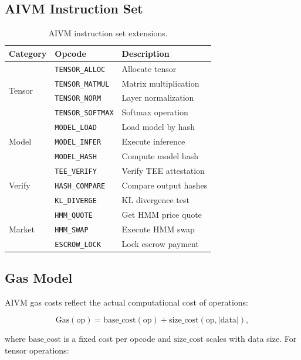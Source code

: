 \documentclass[11pt,twocolumn]{article}
\begin{document}
\subsection{AIVM Instruction Set}

\begin{table}[H]
\centering
\small
\begin{tabular}{lll}
\toprule
\textbf{Category} & \textbf{Opcode} & \textbf{Description} \\
\midrule
\multirow{4}{*}{Tensor} & \texttt{TENSOR\_ALLOC} & Allocate tensor \\
& \texttt{TENSOR\_MATMUL} & Matrix multiplication \\
& \texttt{TENSOR\_NORM} & Layer normalization \\
& \texttt{TENSOR\_SOFTMAX} & Softmax operation \\
\midrule
\multirow{3}{*}{Model} & \texttt{MODEL\_LOAD} & Load model by hash \\
& \texttt{MODEL\_INFER} & Execute inference \\
& \texttt{MODEL\_HASH} & Compute model hash \\
\midrule
\multirow{3}{*}{Verify} & \texttt{TEE\_VERIFY} & Verify TEE attestation \\
& \texttt{HASH\_COMPARE} & Compare output hashes \\
& \texttt{KL\_DIVERGE} & KL divergence test \\
\midrule
\multirow{3}{*}{Market} & \texttt{HMM\_QUOTE} & Get HMM price quote \\
& \texttt{HMM\_SWAP} & Execute HMM swap \\
& \texttt{ESCROW\_LOCK} & Lock escrow payment \\
\bottomrule
\end{tabular}
\caption{AIVM instruction set extensions.}
\label{tab:opcodes}
\end{table}

\subsection{Gas Model}

AIVM gas costs reflect the actual computational cost of operations:

\begin{equation}
\text{Gas}(\text{op}) = \text{base\_cost}(\text{op}) + \text{size\_cost}(\text{op}, |\text{data}|),
\end{equation}

where $\text{base\_cost}$ is a fixed cost per opcode and $\text{size\_cost}$ scales with data size. For tensor operations:
\end{document}

